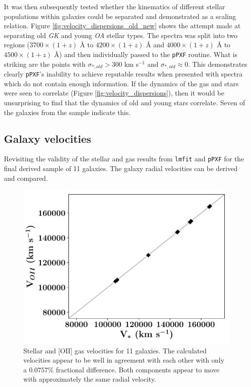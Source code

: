 \documentclass[12pt, twocolumn, nofootinbib]{revtex4-1}    %
\begin{document}
It was then subsequently tested whether the kinematics of different stellar populations within galaxies could be separated and demonstrated as a scaling relation. Figure \ref{fig:velocity_dispersions_old_new} shows the attempt made at separating old \textit{GK} and young \textit{OA} stellar types. The spectra was split into two regions ($3700\times (1+z)$ {\AA} to $4200\times(1+z)$ {\AA} and $4000\times (1+z)$ {\AA} to $4500\times(1+z)$ {\AA}) and then individually passed to the \texttt{pPXF} routine. What is striking are the points with $\sigma_{*,old}>300$ km s$^{-1}$ and $\sigma_{*,old}\approx0$. This demonstrates clearly \texttt{pPXF}'s inability to achieve reputable results when presented with spectra which do not contain enough information. If the dynamics of the gas and stars were seen to correlate (Figure \ref{fig:velocity_dispersions}), then it would be unsurprising to find that the dynamics of old and young stars correlate. Seven of the galaxies from the sample indicate this. 

\vspace{2ex} %
\subsection{Galaxy velocities}
\noindent
Revisiting the validity of the stellar and gas results from \texttt{lmfit} and \texttt{pPXF} for the final derived sample of 11 galaxies. The galaxy radial velocities can be derived and compared. 

\begin{figure}
\includegraphics[width=1.0\linewidth]{data/vel_star_vs_vel_oii}
\caption{Stellar and [OII] gas velocities for 11 galaxies. The calculated velocities appear to be well in agreement with each other with only a $0.0757\%$ fractional difference. Both components appear to move with approximately the same radial velocity.}
\label{fig:velocities}
\end{figure}
\end{document}
